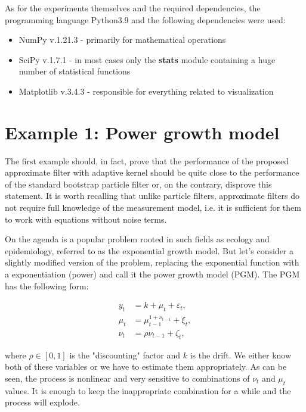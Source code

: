 As for the experiments themselves and the required dependencies, the programming language Python3.9 and the following dependencies were used:
\begin{itemize}
    \item NumPy v.1.21.3 - primarily for mathematical operations
    \item SciPy v.1.7.1 - in most cases only the \textbf{stats} module containing a huge number of statistical functions
    \item Matplotlib v.3.4.3 - responsible for everything related to visualization
\end{itemize}

\section{Example 1: Power growth model}
The first example should, in fact, prove that the performance of the proposed approximate filter with adaptive kernel should be quite close to the performance of the standard bootstrap particle filter or, on the contrary, disprove this statement. It is worth recalling that unlike particle filters, approximate filters do not require full knowledge of the measurement model, i.e. it is sufficient for them to work with equations without noise terms.

On the agenda is a popular problem rooted in such fields as ecology and epidemiology, referred to as the exponential growth model. But let's consider a slightly modified version of the problem, replacing the exponential function with a exponentiation (power)  and call it the power growth model (PGM). The PGM has the following form:

\begin{equation}
\begin{aligned}
    y_t &= k + \mu_t + \varepsilon_t, \\
    \mu_t &= \mu_{t-1}^{1+\nu_{t-1}} + \xi_t, \\    
    \nu_t &= \rho\nu_{t-1} + \zeta_t,
\label{eq:pgm_equations}
\end{aligned}
\end{equation}

\noindent where \(\rho\in[0,1]\) is the "discounting" factor and \(k\) is the drift. We either know both of these variables or we have to estimate them appropriately. As can be seen, the process is nonlinear and very sensitive to combinations of \(\nu_t\) and \(\mu_t\) values. It is enough to keep the inappropriate combination for a while and the process will explode. 

